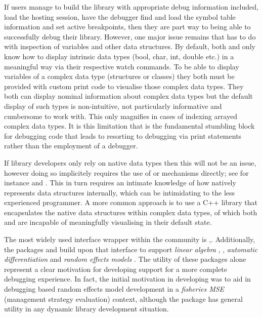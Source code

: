 If users manage to build the library with appropriate debug information included, load the hosting  session, have the debugger find and 
load the symbol table information and set active breakpoints, then they are part way to being able to successfully debug their library. However, 
one major issue remains that has to do with inspection of variables and other data structures. By default, both  and  only 
know how to display intrinsic data types (bool, char, int, double etc.) in a meaningful way via their respective watch commands. To be able to 
display variables of a complex data type (structures or classes) they both must be provided with custom print code to visualise those complex 
data types. They both can display nominal information about complex data types but the default display of such types is non-intuitive, not particularly informative
and cumbersome to work with. This only magnifies in cases of indexing arrayed complex data types. It is this limitation that is the fundamental stumbling block for 
debugging code that leads to resorting to debugging via print statements rather than the employment of a debugger. 

If library developers only rely on native data types then this will not be an issue, however doing so implicitely requires the use of  or 
 mechanisms directly; see for instance \citep{DotC} and \citep{DotC2}. This in turn requires an intimate
knowledge of how  natively represents data structures internally, which can be intimidating to the less experienced programmer. A more common approach is to 
use a C++ library that encapsulates the native  data structures within complex data types, of which both  and  are  
incapable of meaningfully visualising in their default state. 

The most widely used interface wrapper within the  community is \citep{RcppIntro},\citep{Rcpp}. Additionally, the packages  
and  build upon that interface to support \emph{linear algebra} \citep{RcppEigen}, \citep{RcppEigenLA}, \emph{automatic differentiation} \citep{TMBlaplace} and 
\emph{random effects models} \citep{TMB}. The utility of these packages alone represent a clear motivation for developing support for a more complete debugging 
experience. In fact, the initial motivation in developing  was to aid in debugging  based random effects model development in a 
\emph{fisheries MSE} (management strategy evaluation) context, although the package has general utility in any  dynamic library development situation.

